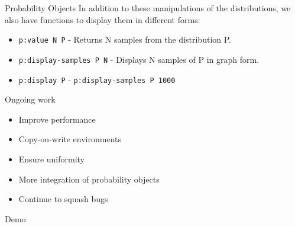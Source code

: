 \documentclass[14pt]{beamer}
\begin{document}
\begin{frame}{Probability Objects}
  In addition to these manipulations of the distributions, we also have
  functions to display them in different forms:\\
  \begin{itemize}
    \item \texttt{p:value N P} - Returns N samples from the distribution P.
    \item \texttt{p:display-samples P N} - Displays N samples of P in graph form.
    \item \texttt{p:display P} - \texttt{p:display-samples P 1000}
  \end{itemize}
\end{frame}

\begin{frame}{Ongoing work}
  \begin{itemize}
    \item Improve performance
    \item Copy-on-write environments
    \item Ensure uniformity
    \item More integration of probability objects
    \item Continue to squash bugs
  \end{itemize}
\end{frame}

\begin{frame}{Demo}
\end{frame}
\end{document}
